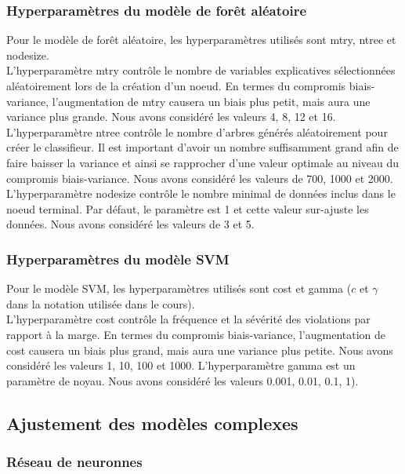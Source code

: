 \subsubsection{Hyperparamètres du modèle de forêt aléatoire}
Pour le modèle de forêt aléatoire, les hyperparamètres utilisés sont mtry, ntree et nodesize.\\
L'hyperparamètre mtry contrôle le nombre de variables explicatives sélectionnées aléatoirement lors de la création d'un noeud. En termes du compromis biais-variance, l'augmentation de mtry causera un biais plus petit, mais aura une variance plus grande.  Nous avons considéré les valeurs 4, 8, 12 et 16.\\
L'hyperparamètre ntree contrôle le nombre d'arbres générés aléatoirement pour créer le classifieur. Il est important d'avoir un nombre suffisamment grand afin de faire baisser la variance et ainsi se rapprocher d'une valeur optimale au niveau du compromis biais-variance. Nous avons considéré les valeurs de 700, 1000 et 2000.
L'hyperparamètre nodesize contrôle le nombre minimal de données inclus dans le noeud terminal. Par défaut, le paramètre est 1 et cette valeur sur-ajuste les données. Nous avons considéré les valeurs de 3 et 5.

\subsubsection{Hyperparamètres du modèle SVM}
Pour le modèle SVM, les hyperparamètres utilisés sont cost et gamma ($c$ et $\gamma$ dans la notation utilisée dans le cours).\\
L'hyperparamètre cost contrôle la fréquence et la sévérité des violations par rapport à la marge. En termes du compromis biais-variance, l'augmentation de cost causera un biais plus grand, mais aura une variance plus petite. Nous avons considéré les valeurs 1, 10, 100 et 1000. L'hyperparamètre gamma est un paramètre de noyau. Nous avons considéré les valeurs 0.001, 0.01, 0.1, 1).\\

\subsection{Ajustement des modèles complexes}

\subsubsection{Réseau de neuronnes}

